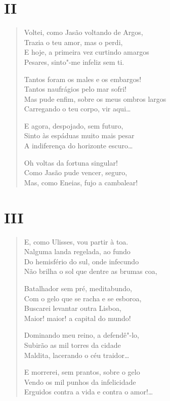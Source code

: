 \medskip
\section*{II}

\begin{verse}
Voltei, como Jasão voltando de Argos,\\
Trazia o teu amor, mas o perdi,\\
E hoje, a primeira vez curtindo amargos\\
Pesares, sinto"-me infeliz sem ti.

Tantos foram os males e os embargos!\\
Tantos naufrágios pelo mar sofri!\\
Mas pude enfim, sobre os meus ombros largos\\
Carregando o teu corpo, vir aqui\ldots{}

E agora, despojado, sem futuro,\\
Sinto às espáduas muito mais pesar\\
A indiferença do horizonte escuro\ldots{}

Oh voltas da fortuna singular!\\
Como Jasão pude vencer, seguro,\\
Mas, como Eneias, fujo a cambalear!
\end{verse}

\medskip
\section*{III}

\begin{verse}
E, como Ulisses, vou partir à toa.\\
Nalguma landa regelada, ao fundo\\
Do hemisfério do sul, onde infecundo\\
Não brilha o sol que dentre as brumas coa,

Batalhador sem pré, meditabundo,\\
Com o gelo que se racha e se esboroa,\\
Buscarei levantar outra Lisboa,\\
Maior! maior! a capital do mundo!

Dominando meu reino, a defendê"-lo,\\
Subirão as mil torres da cidade\\
Maldita, lacerando o céu traidor\ldots{}

E morrerei, sem prantos, sobre o gelo\\
Vendo os mil punhos da infelicidade\\
Erguidos contra a vida e contra o amor!\ldots{}
\end{verse}

